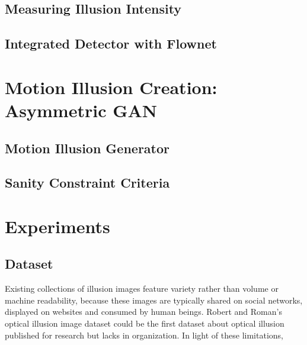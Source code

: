 \documentclass[journal]{IEEEtran}
\begin{document}


\subsection{Measuring Illusion Intensity}
\label{sec:detection_measure}

\subsection{Integrated Detector with Flownet}
\label{sec:detection_idf}

\section{Motion Illusion Creation: Asymmetric GAN}
\label{sec:generation}

\subsection{Motion Illusion Generator}
\label{sec:generation_generator}

\subsection{Sanity Constraint Criteria}
\label{sec:generation_criteria}

\section{Experiments}
\label{sec:experiments}

\subsection{Dataset}

Existing collections of illusion images feature variety rather than volume or machine readability, because these images are typically shared on social networks, displayed on websites and consumed by human beings. Robert and Roman's optical illusion image dataset \cite{williams2018optical} could be the first dataset about optical illusion published for research but lacks in organization. In light of these limitations,
\end{document}
